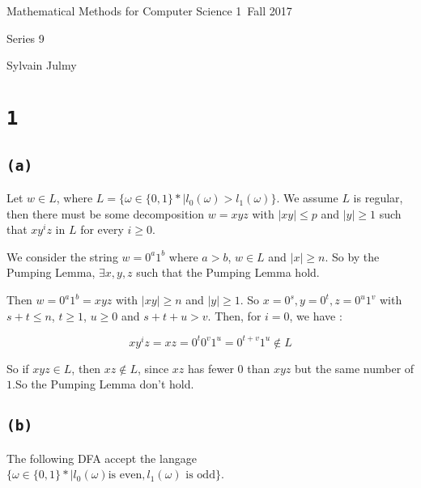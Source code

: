 \documentclass[a4paper,11pt]{report}
\author{Sylvain Julmy}
\date{\today}
\begin{document}
\begin{center}
  \Large{
    Mathematical Methods for Computer Science 1\
    Fall 2017
  }
  \noindent\makebox[\linewidth]{\rule{\linewidth}{0.4pt}}

  Series 9
  \vspace*{1.4cm}

  Sylvain Julmy
  
  \noindent\makebox[\linewidth]{\rule{\linewidth}{0.4pt}}
\end{center}

\section*{\texttt{1}}

\subsection*{\texttt{(a)}}

Let $w \in L$, where  $L = \{\omega \in \{0,1\}* | l_0(\omega) > l_1
(\omega)\}$. We assume $L$ is regular, then there must be some decomposition $w
= xyz$ with $|xy| \leq p$ and $|y| \geq 1$ such that $xy^iz$ in $L$ for every $i
\geq 0$.

We consider the string $w = 0^a1^b$ where $a > b$, $w \in L$ and $|x| \geq n$.
So by the Pumping Lemma, $\exists x,y,z$ such that the Pumping Lemma hold.

Then $w = 0^a1^b = xyz$ with $|xy| \geq n$ and $|y| \geq 1$. So $x = 0^s, y =
0^t, z = 0^u1^v$ with $s+t \leq n$, $t \geq 1$, $u \geq 0$ and $s + t + u > v$.
Then, for $i = 0$, we have :

\[
  xy^iz = xz = 0^t0^v1^u = 0^{t+v}1^u \not\in L
\]

So if $xyz \in L$, then $xz \not\in L$, since $xz$ has fewer $0$ than $xyz$ but
the same number of $1$.So the Pumping Lemma don't hold.

\subsection*{\texttt{(b)}}

The following DFA accept the langage $\{\omega \in \{0,1\}* | l_0(\omega)\text{
  is even}, l_1(\omega)\text{ is odd} \}$.


\begin{center}
\end{center}
\end{document}
